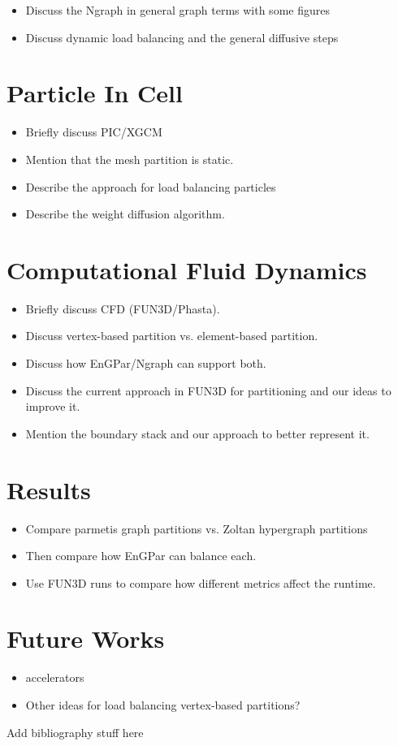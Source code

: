 \documentclass[conference]{IEEEtran}
\begin{document}
\begin{itemize}
\item Discuss the Ngraph in general graph terms with some figures
\item Discuss dynamic load balancing and the general diffusive steps
\end{itemize}

\section{Particle In Cell}

\begin{itemize}
\item Briefly discuss PIC/XGCM
\item Mention that the mesh partition is static.
\item Describe the approach for load balancing particles
\item Describe the weight diffusion algorithm.
\end{itemize}

\section{Computational Fluid Dynamics}

\begin{itemize}
\item Briefly discuss CFD (FUN3D/Phasta).
\item Discuss vertex-based partition vs. element-based partition.
\item Discuss how EnGPar/Ngraph can support both.
\item Discuss the current approach in FUN3D for partitioning and our ideas to improve it.
\item Mention the boundary stack and our approach to better represent it.
\end{itemize}

\section{Results}

\begin{itemize}
\item Compare parmetis graph partitions vs. Zoltan hypergraph partitions
\item Then compare how EnGPar can balance each.
\item Use FUN3D runs to compare how different metrics affect the runtime.
\end{itemize}


\section{Future Works}

\begin{itemize}
\item accelerators
\item Other ideas for load balancing vertex-based partitions?
\end{itemize}

{\color{red} Add bibliography stuff here}
\end{document}
